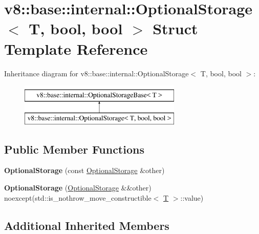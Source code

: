 \hypertarget{structv8_1_1base_1_1internal_1_1OptionalStorage}{}\section{v8\+:\+:base\+:\+:internal\+:\+:Optional\+Storage$<$ T, bool, bool $>$ Struct Template Reference}
\label{structv8_1_1base_1_1internal_1_1OptionalStorage}
Inheritance diagram for v8\+:\+:base\+:\+:internal\+:\+:Optional\+Storage$<$ T, bool, bool $>$\+:\begin{figure}[H]
\begin{center}
\leavevmode
\includegraphics[height=2.000000cm]{structv8_1_1base_1_1internal_1_1OptionalStorage}
\end{center}
\end{figure}
\subsection*{Public Member Functions}
\begin{DoxyCompactItemize}
\item 
\mbox{\label{structv8_1_1base_1_1internal_1_1OptionalStorage_a46f909973643b1f311439d16306caf89}} 
{\bfseries Optional\+Storage} (const \mbox{\hyperlink{structv8_1_1base_1_1internal_1_1OptionalStorage}{Optional\+Storage}} \&other)
\item 
\mbox{\label{structv8_1_1base_1_1internal_1_1OptionalStorage_ab6aaad7fe0e7741f52b49ad6e9044c3a}} 
{\bfseries Optional\+Storage} (\mbox{\hyperlink{structv8_1_1base_1_1internal_1_1OptionalStorage}{Optional\+Storage}} \&\&other) noexcept(std\+::is\+\_\+nothrow\+\_\+move\+\_\+constructible$<$ \mbox{\hyperlink{classv8_1_1internal_1_1torque_1_1T}{T}} $>$\+::value)
\end{DoxyCompactItemize}
\subsection*{Additional Inherited Members}



